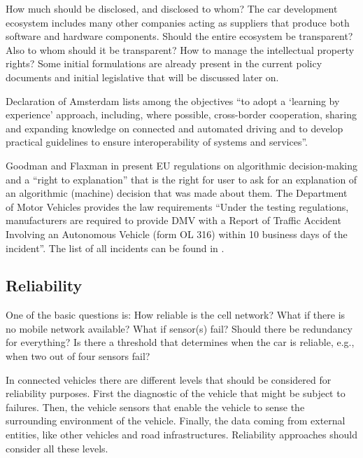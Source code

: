 How much should be disclosed, and disclosed to whom? The car development ecosystem includes many other companies acting as suppliers that produce both software and hardware components. Should the entire ecosystem be transparent? Also to whom should it be transparent? How to manage the intellectual property rights? Some initial formulations are already present in the current policy documents and initial legislative that will be discussed later on.

Declaration of Amsterdam \cite{GovernmentNL2017} lists among the objectives \enquote{to adopt a \enquote{learning by experience} approach, including, where possible, cross-border cooperation, sharing and expanding knowledge on connected and automated driving and to develop practical guidelines to ensure interoperability of systems and services}.

Goodman and Flaxman in \cite{2016arXiv160608813G_GoodmanFlaxman} present EU regulations on algorithmic decision-making and a \enquote{right to explanation} that is the right for user to ask for an explanation of an algorithmic (machine) decision that was made about them.
The Department of Motor Vehicles provides the law requirements \cite{DepartmentofMotorVehiclesStateofCalifornia} \enquote{Under the testing regulations, manufacturers are required to provide DMV with a Report of Traffic Accident Involving an Autonomous Vehicle (form OL 316) within 10 business days of the incident}. The list of all incidents can be found in \cite{DepartmentofMotorVehiclesStateofCalifornia_OL316Reports}.


\subsection{Reliability}
\label{sec:EAofTC:Reliability}

One of the basic questions is: How reliable is the cell network? What if there is no mobile network available? What if sensor(s) fail? Should there be redundancy for everything? Is there a threshold that determines when the car is reliable, e.g., when two out of four sensors fail?  

In connected vehicles there are different levels that should be considered for reliability purposes. First the diagnostic of the vehicle that might be subject to failures. Then, the vehicle sensors that enable the vehicle to sense the surrounding environment of the vehicle. Finally, the data coming from external entities, like other vehicles and road infrastructures. Reliability approaches should consider all these levels.


